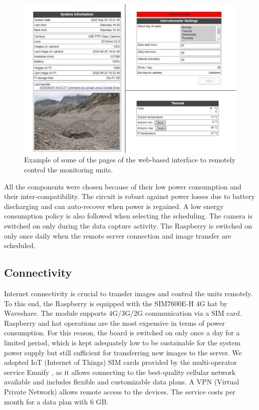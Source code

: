 \begin{figure}[ht!]
  \centering
  \includegraphics[width=1\textwidth]{web_interface.png}
  \caption{Example of some of the pages of the web-based interface to remotely control the monitoring units.}
  \label{fig:4:web-interface}
\end{figure}

All the components were chosen because of their low power consumption and their inter-compatibility. 
The circuit is robust against power losses due to battery discharging and can auto-recover when power is regained. 
A low energy consumption policy is also followed when selecting the scheduling. 
The camera is switched on only during the data capture activity. 
The Raspberry is switched on only once daily when the remote server connection and image transfer are scheduled.

\subsection{Connectivity}\label{Connectivity}
Internet connectivity is crucial to transfer images and control the units remotely. 
To this end, the Raspberry is equipped with the SIM7600E-H 4G hat by Waveshare.
The module supports 4G/3G/2G communication via a SIM card. Raspberry and hat operations are the most expensive in terms of power consumption. 
For this reason, the board is switched on only
once a day for a limited period, which is kept adequately low to be sustainable for the system power supply but still sufficient for transferring new images to the server. 
We adopted IoT (Internet of Things) SIM cards provided by the multi-operator service Emnify \citep{emnify}, as it allows connecting to the best-quality cellular network available and includes flexible and customizable data plans.
A VPN (Virtual Private Network) allows remote access to the devices.
The service costs  per month for a data plan with 6 GB.

